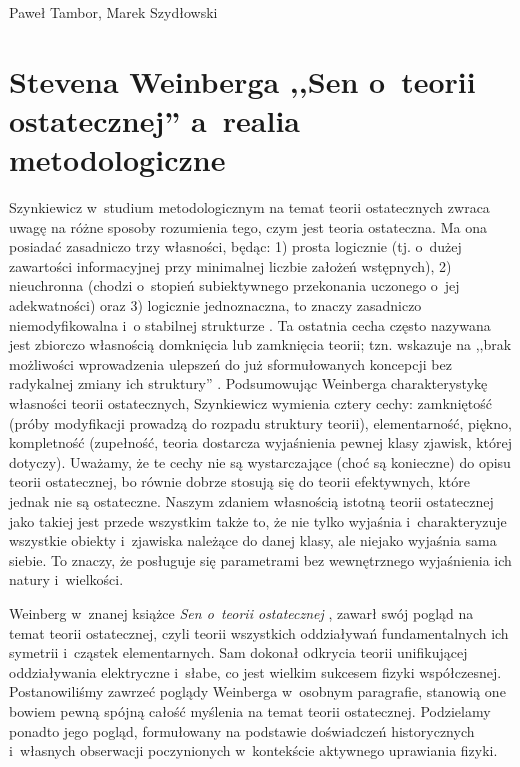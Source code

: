 \begin{artplenv}{Paweł Tambor, Marek Szydłowski}
\section{Stevena Weinberga ,,Sen o~teorii ostatecznej'' a~realia metodologiczne}
Szynkiewicz w~studium metodologicznym na temat teorii ostatecznych zwraca uwagę na różne sposoby rozumienia tego, czym jest teoria ostateczna. Ma ona posiadać zasadniczo trzy własności, będąc: 1) prosta logicznie (tj. o~dużej zawartości informacyjnej przy minimalnej liczbie założeń wstępnych), 2) nieuchronna (chodzi o~stopień subiektywnego przekonania uczonego o~jej adekwatności) oraz 3) logicznie jednoznaczna, to znaczy zasadniczo niemodyfikowalna i~o stabilnej strukturze 
\parencite[][s.~17]{szynkiewicz_teorie_2009}. %
 Ta ostatnia cecha często nazywana jest zbiorczo własnością domknięcia lub zamknięcia teorii; tzn. wskazuje na ,,brak możliwości wprowadzenia ulepszeń do już sformułowanych koncepcji bez radykalnej zmiany ich struktury'' 
\parencite[][s.~19]{szynkiewicz_teorie_2009}. %
 Podsumowując Weinberga charakterystykę własności teorii ostatecznych, Szynkiewicz wymienia cztery cechy: zamkniętość (próby modyfikacji prowadzą do rozpadu struktury teorii), elementarność, piękno, kompletność (zupełność, teoria dostarcza wyjaśnienia pewnej klasy zjawisk, której dotyczy). Uważamy, że te cechy nie są wystarczające (choć są konieczne) do opisu teorii ostatecznej, bo równie dobrze stosują się do teorii efektywnych, które jednak nie są ostateczne. Naszym zdaniem własnością istotną teorii ostatecznej jako takiej jest przede wszystkim także to, że nie tylko wyjaśnia i~charakteryzuje wszystkie obiekty i~zjawiska należące do danej klasy, ale niejako wyjaśnia sama siebie. To znaczy, że posługuje się parametrami bez wewnętrznego wyjaśnienia ich natury i~wielkości.

Weinberg w~znanej książce \textit{Sen o~teorii ostatecznej}
\parencite*[][]{weinberg_sen_1992}, %
 zawarł swój pogląd na temat teorii ostatecznej, czyli teorii wszystkich oddziaływań fundamentalnych ich symetrii i~cząstek elementarnych. Sam dokonał odkrycia teorii unifikującej oddziaływania elektryczne i~słabe, co jest wielkim sukcesem fizyki współczesnej. Postanowiliśmy zawrzeć poglądy Weinberga w~osobnym paragrafie, stanowią one bowiem pewną spójną całość myślenia na temat teorii ostatecznej. Podzielamy ponadto jego pogląd, formułowany na podstawie doświadczeń historycznych i~własnych obserwacji poczynionych w~kontekście aktywnego uprawiania fizyki.


\end{artplenv}

